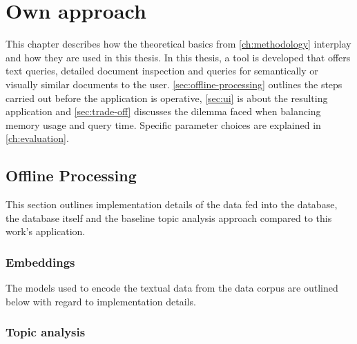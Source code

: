 \chapter{Own approach}\label{ch:implementation}

This chapter describes how the theoretical basics from \autoref{ch:methodology} interplay and how they are used in this thesis.
In this thesis, a tool is developed that offers text queries, detailed document inspection and queries for semantically or visually similar documents to the user.
\autoref{sec:offline-processing} outlines the steps carried out before the application is operative, 
\autoref{sec:ui} is about the resulting application and 
\autoref{sec:trade-off} discusses the dilemma faced when balancing memory usage and query time. 
Specific parameter choices are explained in \autoref{ch:evaluation}.


\section{Offline Processing}\label{sec:offline-processing}
This section outlines implementation details of the data fed into the database, the database itself and the baseline topic analysis approach compared to this work's application.




\subsection{Embeddings}\label{subsec:impl-embeddings}
The models used to encode the textual data from the data corpus are outlined below with regard to implementation details.















\subsection{Topic analysis}\label{impl-topic-modeling}

